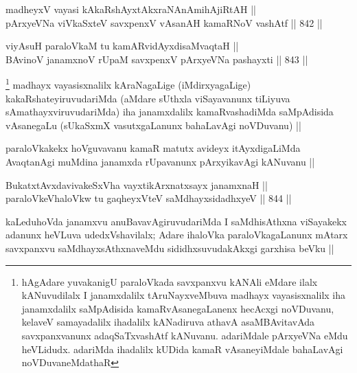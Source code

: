 \begin{shl}
madheyxV vayasi kAkaRshAyxtAkxraNAnAmihA\s \s jiRtAH || \\
pArxyeVNa viVkaSxteV savxpenxV vAsanAH kamaRNoV vashAtf ||  842 ||  
\end{shl}
				
\begin{shl}
viyAsuH paraloVkaM tu kamARvidAyxdisaMvaqtaH || \\
BAvinoV janamxnoV rUpaM savxpenxV pArxyeVNa pashayxti ||  843 ||  
\end{shl}

\begin{artha}
\footnote{hAgAdare yuvakanigU paraloVkada savxpanxvu kANAli eMdare ilalx kANuvudilalx I janamxdalilx tAruNayxveMbuva madhayx vayasisxnalilx iha janamxdalilx saMpAdisida kamaRvAsanegaLanenx hecAcxgi noVDuvanu, kelaveV samayadalilx ihadalilx kANadiruva athavA asaMBAvitavAda savxpanxvanunx adaqSaTxvashAtf kANuvanu. adariMdale pArxyeVNa eMdu heVLidudx. adariMda ihadalilx kUDida kamaR vAsaneyiMdale bahaLavAgi noVDuvaneMdathaR}
madhayx vayasisxnalilx kAraNagaLige (iMdirxyagaLige) kakaRshateyiruvudariMda (aMdare sUthxla viSayavanunx tiLiyuva sAmathayxviruvudariMda) iha janamxdalilx kamaRvashadiMda saMpAdisida vAsanegaLu (sUkaSxmX vasutxgaLanunx bahaLavAgi noVDuvanu) ||
\end{artha}

\begin{artha}
paraloVkakekx hoVguvavanu kamaR matutx avideyx itAyxdigaLiMda AvaqtanAgi muMdina janamxda rUpavanunx pArxyikavAgi kANuvanu ||
\end{artha}


\begin{shl}
BukatxtAvxdavivakeSxVha vayxtikArxnatxsayx janamxnaH || \\
paraloVkeVhaloVkw tu gaqheyxVteV saMdhayxsidadhxyeV ||  844 ||  
\end{shl}

\begin{artha}
kaLeduhoVda janamxvu anuBavavAgiruvudariMda I saMdhisAthxna viSayakekx adanunx heVLuva udedxVshavilalx; Adare ihaloVka paraloVkagaLanunx mAtarx savxpanxvu saMdhayxsAthxnaveMdu sididhxsuvudakAkxgi garxhisa beVku ||
\end{artha}


